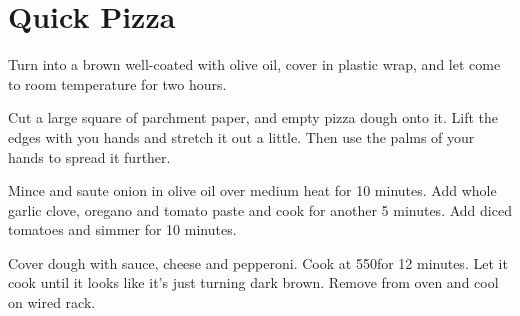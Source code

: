 \section{Quick Pizza}
\begin{recipe}



Turn into a brown well-coated with olive oil, cover in plastic wrap, and let
come to room temperature for two hours.

Cut a large square of parchment paper, and empty pizza dough onto it. Lift the
edges with you hands and stretch it out a little. Then use the palms of your
hands to spread it further.


Mince and saute onion in olive oil over medium heat for 10 minutes. Add whole
garlic clove, oregano and tomato paste and cook for another 5 minutes. Add
diced tomatoes and simmer for 10 minutes.


Cover dough with sauce, cheese and pepperoni. Cook at 550\degree for 12 minutes.
Let it cook until it looks like it's just turning dark brown. Remove from oven
and cool on wired rack.


\end{recipe}
